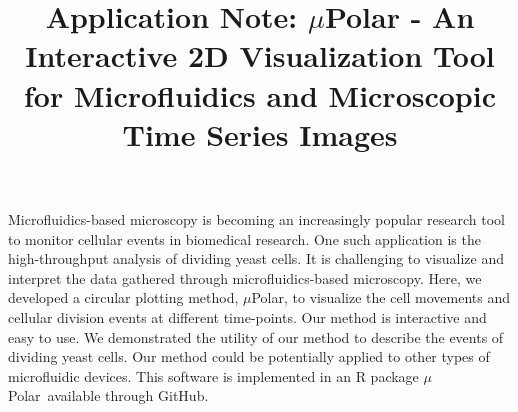 \documentclass[conference]{IEEEtran}
\begin{document}
\title{ Application Note: $\mu$Polar \-- An Interactive 2D Visualization Tool for  Microfluidics and  Microscopic Time Series Images }


\maketitle


\begin{Summary}

Microfluidics-based microscopy is becoming an increasingly popular research tool to monitor cellular events in biomedical research. One such application is the high-throughput analysis of dividing yeast cells. It is challenging to visualize and interpret the data gathered through microfluidics-based microscopy. Here, we developed a circular plotting method, $\mu$Polar, to visualize the cell movements and cellular division events at different time-points. Our method is interactive and easy to use. We demonstrated the utility of our method to describe the events of dividing yeast cells. Our method could be potentially applied to other types of microfluidic devices. This software is implemented in an R package $\mu$Polar\ available through GitHub.


\end{Summary}
\end{document}

